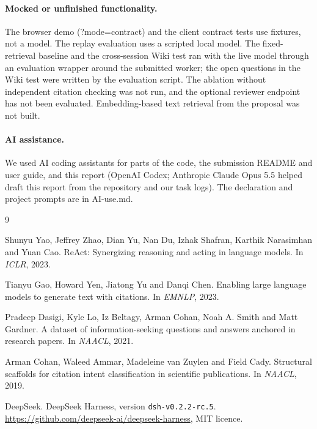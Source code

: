 \documentclass{article}
\newcommand{\code}[1]{{\ttfamily\small\hyphenchar\font=-1\relax #1}}
\begin{document}
\paragraph{Mocked or unfinished functionality.}
The browser demo (\code{?mode=contract}) and the client contract tests use fixtures, not a model. The
replay evaluation uses a scripted local model. The fixed-retrieval baseline and the cross-session Wiki
test ran with the live model through an evaluation wrapper around the submitted worker; the open
questions in the Wiki test were written by the evaluation script. The ablation without independent
citation checking was not run, and the optional reviewer endpoint has not been evaluated.
Embedding-based text retrieval from the proposal was not built.

\paragraph{AI assistance.}
We used AI coding assistants for parts of the code, the submission README and user guide, and this
report (OpenAI Codex; Anthropic Claude Opus 5.5 helped draft this report from the repository and our
task logs). The declaration and project prompts are in \code{AI-use.md}.

\clearpage
\begin{thebibliography}{9}

Shunyu Yao, Jeffrey Zhao, Dian Yu, Nan Du, Izhak Shafran, Karthik Narasimhan and Yuan Cao.
\newblock ReAct: Synergizing reasoning and acting in language models.
\newblock In \emph{ICLR}, 2023.

Tianyu Gao, Howard Yen, Jiatong Yu and Danqi Chen.
\newblock Enabling large language models to generate text with citations.
\newblock In \emph{EMNLP}, 2023.

Pradeep Dasigi, Kyle Lo, Iz Beltagy, Arman Cohan, Noah A. Smith and Matt Gardner.
\newblock A dataset of information-seeking questions and answers anchored in research papers.
\newblock In \emph{NAACL}, 2021.



Arman Cohan, Waleed Ammar, Madeleine van Zuylen and Field Cady.
\newblock Structural scaffolds for citation intent classification in scientific publications.
\newblock In \emph{NAACL}, 2019.

DeepSeek.
\newblock DeepSeek Harness, version \texttt{dsh-v0.2.2-rc.5}.
\newblock \url{https://github.com/deepseek-ai/deepseek-harness}, MIT licence.

\end{thebibliography}
\end{document}
